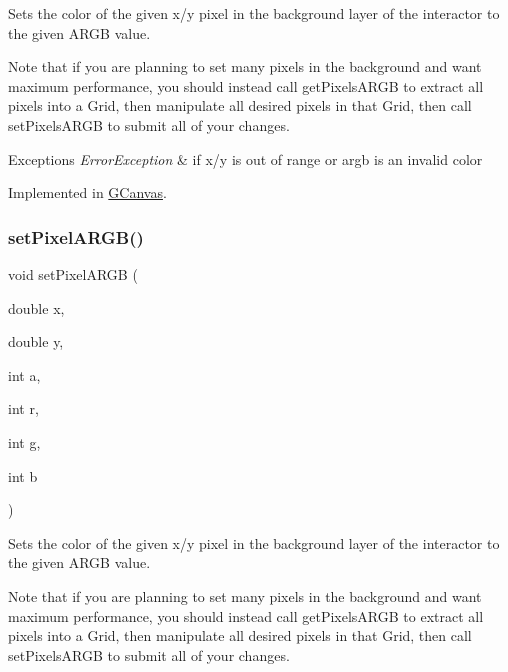Sets the color of the given x/y pixel in the background layer of the interactor to the given A\+R\+GB value. 

Note that if you are planning to set many pixels in the background and want maximum performance, you should instead call get\+Pixels\+A\+R\+GB to extract all pixels into a Grid, then manipulate all desired pixels in that Grid, then call set\+Pixels\+A\+R\+GB to submit all of your changes.


\begin{DoxyExceptions}{Exceptions}
{\em Error\+Exception} & if x/y is out of range or argb is an invalid color \\
\hline
\end{DoxyExceptions}


Implemented in \mbox{\hyperlink{classGCanvas_ae189342d4b4235efa2ece08e08758499}{G\+Canvas}}.

\mbox{\label{classGDrawingSurface_a62a8b1555ae3a073a84b0a1c071c65b1}} 
\subsubsection{\texorpdfstring{set\+Pixel\+A\+R\+G\+B()}{setPixelARGB()}\hspace{0.1cm}{\footnotesize\ttfamily [2/2]}}
{\footnotesize\ttfamily void set\+Pixel\+A\+R\+GB (\begin{DoxyParamCaption}\item[{double}]{x,  }\item[{double}]{y,  }\item[{int}]{a,  }\item[{int}]{r,  }\item[{int}]{g,  }\item[{int}]{b }\end{DoxyParamCaption})\hspace{0.3cm}{\ttfamily [virtual]}}



Sets the color of the given x/y pixel in the background layer of the interactor to the given A\+R\+GB value. 

Note that if you are planning to set many pixels in the background and want maximum performance, you should instead call get\+Pixels\+A\+R\+GB to extract all pixels into a Grid, then manipulate all desired pixels in that Grid, then call set\+Pixels\+A\+R\+GB to submit all of your changes.


